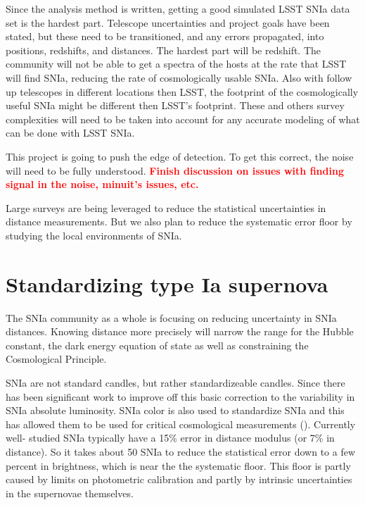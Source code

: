\documentclass[apj, iop]{emulateapj}
\newcommand{\sn}{SNIa}
\newcommand{\todo}[1]{\textbf{\textcolor{red}{#1}}}
\begin{document}
Since the analysis method is written, getting a good simulated LSST \sn{} data
set is the hardest part. Telescope uncertainties and project goals have been
stated, but these need to be transitioned, and any errors propagated, into
positions, redshifts, and distances. The hardest part will be redshift. The
community will not be able to get a spectra of the hosts at the rate that LSST
will find \sn, reducing the rate of cosmologically usable \sn. Also with follow
up telescopes in different locations then LSST, the footprint of the
cosmologically useful \sn{} might be different then LSST's footprint. These and
others survey complexities will need to be taken into account for any accurate
modeling of what can be done with LSST \sn{}.

This project is going to push the edge of detection. To get this correct, the
noise will need to be fully understood. \todo{Finish discussion on issues with
finding signal in the noise, minuit's issues, etc.}

Large surveys are being leveraged to reduce the statistical uncertainties
in distance measurements. But we also plan to reduce the systematic error floor
by studying the local environments of \sn{}.

\section{Standardizing type Ia
supernova}\label{standardizing-type-ia-supernova}

The \sn{} community as a whole is focusing on reducing uncertainty in \sn{}
distances. Knowing distance more precisely will narrow the range for the Hubble
constant, the dark energy equation of state as well as constraining the
Cosmological Principle.

\sn{} are not standard candles, but rather standardizeable candles. Since
\cite{Phillips93} there has been significant work to improve off this basic
correction to the variability in \sn{} absolute luminosity. \sn{} color is also
used to standardize \sn{} and this has allowed them to be used for critical
cosmological measurements (\citep{Riess98, Perlmutter99}). Currently well-
studied \sn{} typically have a 15\% error in distance modulus (or 7\% in
distance). So it takes about 50 \sn{} to reduce the statistical error down to a
few percent in brightness, which is near the the systematic floor. This floor
is partly caused by limits on photometric calibration and partly by intrinsic
uncertainties in the supernovae themselves.
\end{document}

